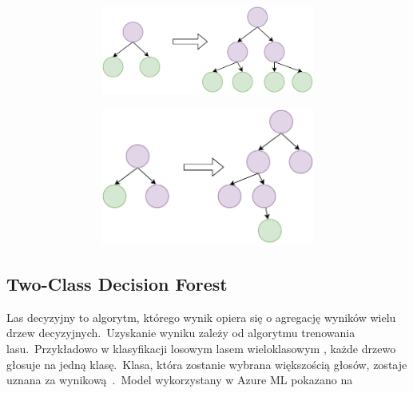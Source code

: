 \begin{figure}[H]
\begin{subfigure}[m]{0.3\textwidth}
    \end{subfigure}
    \hfill
    \begin{subfigure}[m]{0.66\textwidth}
        \begin{subfigure}[m]{\textwidth}
            \includegraphics[width=\textwidth]{images/level-wise}
        \end{subfigure}
        \begin{subfigure}[m]{\textwidth}
            \includegraphics[width=\textwidth]{images/leaf-wise}
        \end{subfigure}
        \label{fig:leaf}
    \end{subfigure}
\end{figure}
\vfill
\pagebreak

\subsection{Two-Class Decision Forest}
Las decyzyjny to algorytm, którego wynik opiera się o agregację wyników wielu drzew decyzyjnych.\ Uzyskanie wyniku zależy od algorytmu trenowania lasu.\ Przykładowo w klasyfikacji losowym lasem wieloklasowym , każde drzewo głosuje na jedną klasę.\ Klasa, która zostanie wybrana większością głosów, zostaje uznana za wynikową~\cite{Google}.\ Model wykorzystany w Azure ML pokazano na 

